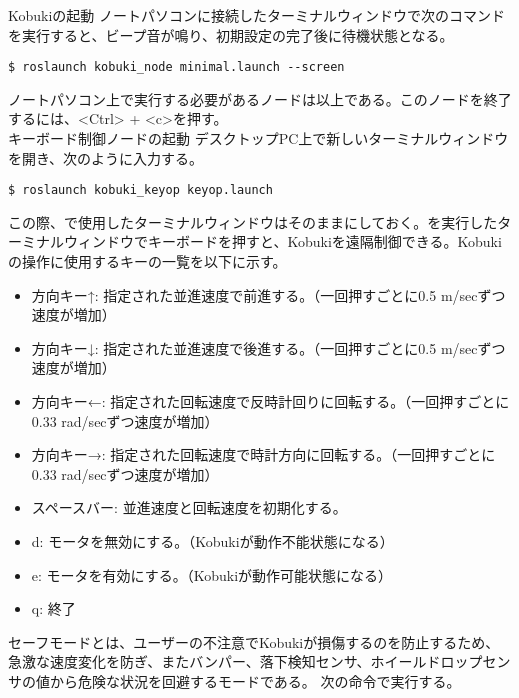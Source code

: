 \begin{itemize}
\circled{\thenum} Kobukiの起動
ノートパソコンに接続したターミナルウィンドウで次のコマンドを実行すると、ビープ音が鳴り、初期設定の完了後に待機状態となる。

\begin{lstlisting}[language=ROS]
$ roslaunch kobuki_node minimal.launch --screen
\end{lstlisting}

ノートパソコン上で実行する必要があるノードは以上である。このノードを終了  するには、<Ctrl> + <c>を押す。\\

\circled{\thenum} キーボード制御ノードの起動
デスクトップPC上で新しいターミナルウィンドウを開き、次のように入力する。

\begin{lstlisting}[language=ROS]
$ roslaunch kobuki_keyop keyop.launch
\end{lstlisting}

この際、で使用したターミナルウィンドウはそのままにしておく。を実行したターミナルウィンドウでキーボードを押すと、Kobukiを遠隔制御できる。Kobukiの操作に使用するキーの一覧を以下に示す。


\begin{itemize}
\item 方向キー↑: 指定された並進速度で前進する。（一回押すごとに0.5 m/secずつ速度が増加）
\item 方向キー↓: 指定された並進速度で後進する。（一回押すごとに0.5 m/secずつ速度が増加）
\item 方向キー←: 指定された回転速度で反時計回りに回転する。（一回押すごとに0.33 rad/secずつ速度が増加）
\item 方向キー→: 指定された回転速度で時計方向に回転する。（一回押すごとに0.33 rad/secずつ速度が増加）
\item スペースバー: 並進速度と回転速度を初期化する。
\item d: モータを無効にする。（Kobukiが動作不能状態になる）
\item e: モータを有効にする。（Kobukiが動作可能状態になる）
\item q: 終了
\end{itemize}

\begin{exercise}
セーフモードとは、ユーザーの不注意でKobukiが損傷するのを防止するため、急激な速度変化を防ぎ、またバンパー、落下検知センサ、ホイールドロップセンサの値から危険な状況を回避するモードである。  次の命令で実行する。


\end{exercise}
\end{itemize}
